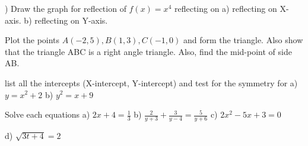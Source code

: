 \documentclass{exam}
\begin{document}
\begin{questions}
	\clearpage
	) Draw the graph for reflection of \(f(x)=x^4\) reflecting on 
	\subitem a) reflecting on X-axis.
	\subitem b) reflecting on Y-axis.
	
	\clearpage
	\question Plot the points \(A(-2,5), B(1,3), C(-1,0)\) and form the triangle. Also show that the triangle ABC is a right angle triangle. Also, find the mid-point of side AB.
	
	\clearpage
	\question list all the intercepts (X-intercept, Y-intercept) and test for the symmetry for 
	\subitem a) $y=x^2+2$
	\clearpage
	\subitem b) $y^2=x+9$
	
	\clearpage
	\question Solve each equations
	\subitem a) $2x+4=\frac{1}{3}$
	\vspace{5cm}
	\subitem b) $\frac{2}{y+3}+ \frac{3}{y-4}=\frac{5}{y+6}$
	\vspace{7cm}
	\subitem c) $2x^2-5x+3=0$
	
	\vspace{7cm}
	\subitem d) $\sqrt{3t+4}=2$
	
\end{questions}
\clearpage
\end{document}
